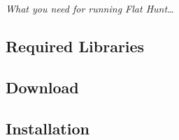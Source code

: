 \emph{What you need for running \emph{Flat Hunt}\ldots}

\subsection{Required Libraries}
\subsection{Download}
\subsection{Installation}
